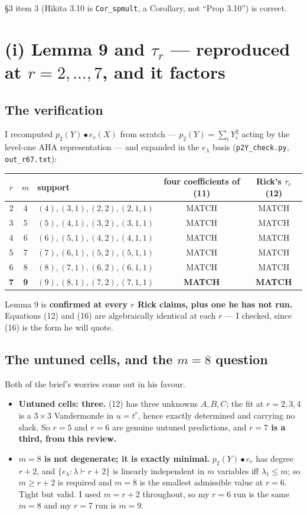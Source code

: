 \documentclass[11pt]{article}
\begin{document}
\S3 item 3 (Hikita 3.10 is \texttt{Cor\_spmult}, a Corollary, not ``Prop 3.10'') is correct.

\section{(i) Lemma 9 and $\tau_r$ --- reproduced at $r=2,\dots,7$, and it factors}
\subsection{The verification}
I recomputed $p_2(Y)\bullet e_r(X)$ from scratch --- $p_2(Y)=\sum_i Y_i^2$ acting by the
level-one AHA representation --- and expanded in the $e_\lambda$ basis
(\texttt{p2Y\_check.py}, \texttt{out\_r67.txt}):

\begin{center}
\begin{tabular}{@{}cclcc@{}}
\toprule
$r$ & $m$ & support & four coefficients of (11) & Rick's $\tau_r$ (12) \\
\midrule
2 & 4 & $(4),(3,1),(2,2),(2,1,1)$ & MATCH & MATCH \\
3 & 5 & $(5),(4,1),(3,2),(3,1,1)$ & MATCH & MATCH \\
4 & 6 & $(6),(5,1),(4,2),(4,1,1)$ & MATCH & MATCH \\
5 & 7 & $(7),(6,1),(5,2),(5,1,1)$ & MATCH & MATCH \\
6 & 8 & $(8),(7,1),(6,2),(6,1,1)$ & MATCH & MATCH \\
\textbf{7} & \textbf{9} & $(9),(8,1),(7,2),(7,1,1)$ & \textbf{MATCH} & \textbf{MATCH} \\
\bottomrule
\end{tabular}
\end{center}
Lemma 9 is \textbf{confirmed at every $r$ Rick claims, plus one he has not run.} Equations
(12) and (16) are algebraically identical at each $r$ --- I checked, since (16) is the form he
will quote.

\subsection{The untuned cells, and the $m=8$ question}
Both of the brief's worries come out in his favour.
\begin{itemize}
\item \textbf{Untuned cells: three.} (12) has three unknowns $A,B,C$; the fit at $r=2,3,4$ is
a $3\times3$ Vandermonde in $u=t^r$, hence exactly determined and carrying no slack. So
$r=5$ and $r=6$ are genuine untuned predictions, and \textbf{$r=7$ is a third, from this
review.}
\item \textbf{$m=8$ is not degenerate; it is exactly minimal.} $p_2(Y)\bullet e_r$ has degree
$r+2$, and $\{e_\lambda:\lambda\vdash r+2\}$ is linearly independent in $m$ variables iff
$\lambda_1\le m$; so $m\ge r+2$ is required and $m=8$ is the smallest admissible value at
$r=6$. Tight but valid. I used $m=r+2$ throughout, so my $r=6$ run is the same $m=8$ and my
$r=7$ run is $m=9$.
\end{itemize}
\end{document}
